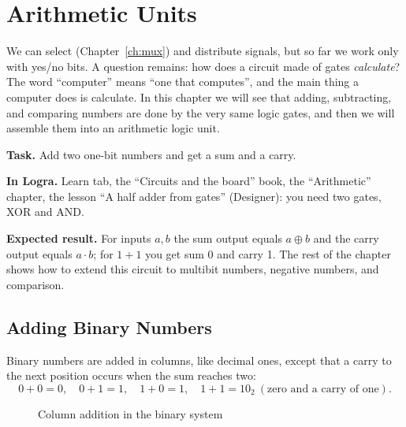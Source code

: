 \chapter{Arithmetic Units}
\label{ch:arith}

We can select (Chapter~\ref{ch:mux}) and distribute signals, but so far we work
only with yes/no bits. A question remains: how does a circuit made of gates
\emph{calculate}? The word ``computer'' means ``one that computes'', and the
main thing a computer does is calculate. In this chapter we will see that
adding, subtracting, and comparing numbers are done by the very same logic
gates, and then we will assemble them into an arithmetic logic unit.

\begin{buildbox}
\textbf{Task.} Add two one-bit numbers and get a sum and a carry.

\textbf{In Logra.} Learn tab, the ``Circuits and the board'' book, the
``Arithmetic'' chapter, the lesson ``A half adder from gates'' (Designer): you
need two gates, XOR and AND.

\textbf{Expected result.} For inputs $a,b$ the sum output equals $a\oplus b$ and
the carry output equals $a\cdot b$; for $1+1$ you get sum 0 and carry 1. The
rest of the chapter shows how to extend this circuit to multibit numbers,
negative numbers, and comparison.
\end{buildbox}

\section{Adding Binary Numbers}

Binary numbers are added in columns, like decimal ones, except that a carry to
the next position occurs when the sum reaches two:
\[
  0+0 = 0, \quad 0+1 = 1, \quad 1+0 = 1, \quad 1+1 = 10_2 \ (\text{zero and a carry of one}).
\]

\begin{figure}[H]
\centering
{}
\caption{Column addition in the binary system}
\end{figure}

